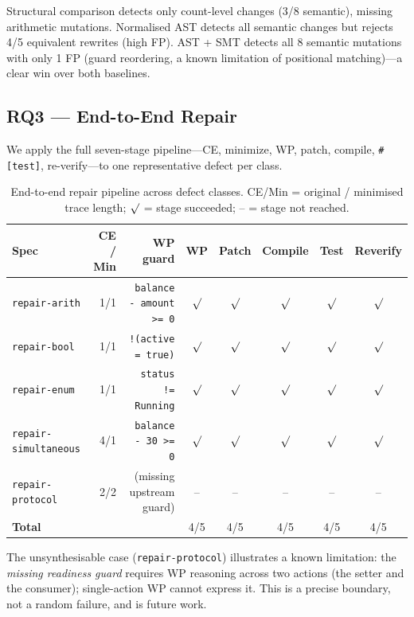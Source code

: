 \documentclass[runningheads]{../paper-vmcai-2027/llncs}
\begin{document}
Structural comparison detects only count-level changes (3/8 semantic),
missing arithmetic mutations.
Normalised AST detects all semantic changes but rejects 4/5 equivalent
rewrites (high FP).
AST + SMT detects all 8 semantic mutations with only 1 FP
(guard reordering, a known limitation of positional matching)---a clear
win over both baselines.

\subsection{RQ3 --- End-to-End Repair}\label{sec:eval:repair}

We apply the full seven-stage pipeline---CE, minimize, WP, patch, compile,
\texttt{\#[test]}, re-verify---to one representative defect per class.

\begin{table}[t]
\caption{End-to-end repair pipeline across defect classes.
  CE/Min = original / minimised trace length;
  $\surd$ = stage succeeded; -- = stage not reached.}\label{tab:repair}
\centering\scriptsize
\begin{tabular}{lrrccccc}
\toprule
Spec & CE / Min & WP guard & WP & Patch & Compile & Test & Reverify \\
\midrule
\texttt{repair-arith}       & 1/1 & \texttt{balance - amount >= 0} & $\surd$ & $\surd$ & $\surd$ & $\surd$ & $\surd$ \\
\texttt{repair-bool}        & 1/1 & \texttt{!(active = true)}      & $\surd$ & $\surd$ & $\surd$ & $\surd$ & $\surd$ \\
\texttt{repair-enum}        & 1/1 & \texttt{status != Running}      & $\surd$ & $\surd$ & $\surd$ & $\surd$ & $\surd$ \\
\texttt{repair-simultaneous}& 4/1 & \texttt{balance - 30 >= 0}      & $\surd$ & $\surd$ & $\surd$ & $\surd$ & $\surd$ \\
\texttt{repair-protocol}    & 2/2 & (missing upstream guard)        & --      & --      & --      & --      & -- \\
\midrule
\textbf{Total}              &     &                                 & 4/5 & 4/5 & 4/5 & 4/5 & 4/5 \\
\bottomrule
\end{tabular}
\end{table}

The unsynthesisable case (\texttt{repair-protocol}) illustrates a known
limitation: the \emph{missing readiness guard} requires WP reasoning across
two actions (the setter and the consumer); single-action WP cannot express it.
This is a precise boundary, not a random failure, and is future work.
\end{document}
